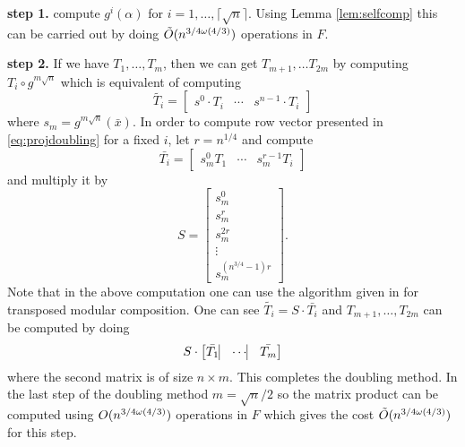 \textbf{step 1.} compute $g^i(\alpha)$ for $i = 1, \ldots , \lceil \sqrt{n} \rceil$. Using Lemma \ref{lem:selfcomp} this 
can be carried out by doing $\tilde{O}(n^{3/4 \omega(4/3)})$ operations in $F$.

\textbf{step 2.} If we have $T_1, \ldots , T_m$, then we can get $T_{m+1}, \ldots T_{2m}$ by computing $T_i \circ g^{m\sqrt{n}}$
which is equivalent of computing 
\begin{equation}\label{eq:projdoubling}
\tilde{T_i} = \begin{bmatrix} s^0 \cdot T_i & \cdots & s^{n-1}\cdot T_i \end{bmatrix}
\end{equation}
where $s_m = g^{m\sqrt{n}}(\bar{x})$. In order to compute row vector presented in \ref{eq:projdoubling} for a fixed $i$, let 
$r = n^{1/4}$ and compute 
$$
\bar{T_i} = \left[\begin{array}{c|c|c}
s_m^0T_1 & \cdots & s_m^{r-1}T_i
\end{array} \right]
$$
and multiply it by 
$$S = \left[
\begin{array}{c}
s_m^0\\
\hline
s_m^{r}\\
\hline
s_m^{2r}\\
\hline
\vdots\\
\hline
s_m^{(n^{3/4}-1)r}
\end{array} \right].
$$
Note that in the above computation one can use the algorithm given in \cite{Shoup}
for transposed modular composition. 
One can see $\tilde{T_i} = S \cdot \bar{T_i}$ and $T_{m+1}, \ldots, T_{2m}$ can be computed by doing
$$ S \cdot \begin{bmatrix} \bar{T_1}\vline & \cdots \vline & \bar{T_m} \end{bmatrix}$$
where the second matrix is of size $n \times m$. This completes the doubling method. In the last step of the doubling method
$m = \sqrt{n}/2$ so the matrix product can be computed using $O(n^{3/4 \omega(4/3)})$ operations in $F$ which gives the cost $\tilde{O}(n^{3/4 \omega(4/3)})$
for this step.


